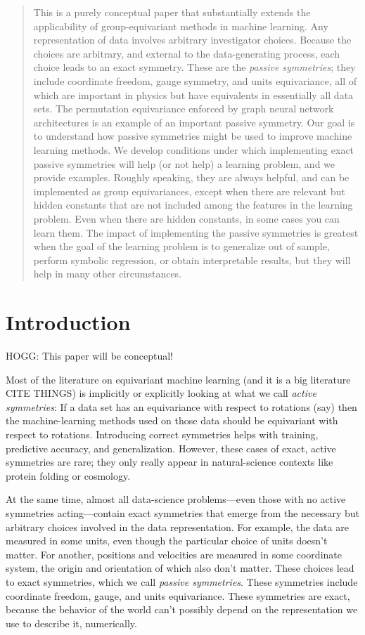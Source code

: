 \documentclass{article}
\theoremstyle{plain}
\theoremstyle{definition}
\theoremstyle{remark}
\begin{document}
\begin{abstract}
This is a purely conceptual paper that substantially extends the applicability of group-equivariant methods in machine learning.
Any representation of data involves arbitrary investigator choices.
Because the choices are arbitrary, and external to the data-generating process, each choice leads to an exact symmetry.
These are the \emph{passive symmetries}; they include coordinate freedom, gauge symmetry, and units equivariance, all of which are important in physics but have equivalents in essentially all data sets.
The permutation equivariance enforced by graph neural network architectures is an example of an important passive symmetry.
Our goal is to understand how passive symmetries might be used to improve machine learning methods.
We develop conditions under which implementing exact passive symmetries will help (or not help) a learning problem, and we provide examples.
Roughly speaking, they are always helpful, and can be implemented as group equivariances, except when there are relevant but hidden constants that are not included among the features in the learning problem.
Even when there are hidden constants, in some cases you can learn them.
The impact of implementing the passive symmetries is greatest when the goal of the learning problem is to generalize out of sample, perform symbolic regression, or obtain interpretable results, but they will help in many other circumstances.
\end{abstract}

\section{Introduction}\label{sec:intro}

HOGG: This paper will be conceptual!

Most of the literature on equivariant machine learning (and it is a big literature CITE THINGS) is implicitly or explicitly looking at what we call \emph{active symmetries}:
If a data set has an equivariance with respect to rotations (say) then the machine-learning methods used on those data should be equivariant with respect to rotations.
Introducing correct symmetries helps with training, predictive accuracy, and generalization.
However, these cases of exact, active symmetries are rare; they only really appear in natural-science contexts like protein folding or cosmology.

At the same time, almost all data-science problems---even those with no active symmetries acting---contain exact symmetries that emerge from the necessary but arbitrary choices involved in the data representation.
For example, the data are measured in some units, even though the particular choice of units doesn't matter.
For another, positions and velocities are measured in some coordinate system, the origin and orientation of which also don't matter.
These choices lead to exact symmetries, which we call \emph{passive symmetries}.
These symmetries include coordinate freedom, gauge, and units equivariance.
These symmetries are exact, because the behavior of the world can't possibly depend on the representation we use to describe it, numerically.
\end{document}
